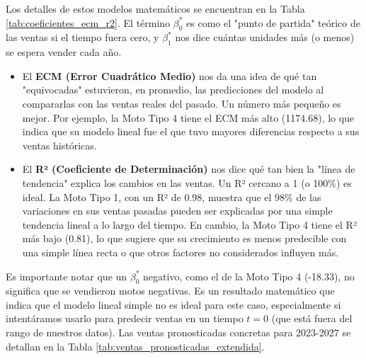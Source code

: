 \documentclass[12pt,a4paper]{article}
\begin{document}
Los detalles de estos modelos matemáticos se encuentran en la Tabla \ref{tab:coeficientes_ecm_r2}. El término $\beta_0^*$ es como el "punto de partida" teórico de las ventas si el tiempo fuera cero, y $\beta_1^*$ nos dice cuántas unidades más (o menos) se espera vender cada año.
\begin{itemize}
    \item El \textbf{ECM (Error Cuadrático Medio)} nos da una idea de qué tan "equivocadas" estuvieron, en promedio, las predicciones del modelo al compararlas con las ventas reales del pasado. Un número más pequeño es mejor. Por ejemplo, la Moto Tipo 4 tiene el ECM más alto (1174.68), lo que indica que su modelo lineal fue el que tuvo mayores diferencias respecto a sus ventas históricas.
    \item El \textbf{R² (Coeficiente de Determinación)} nos dice qué tan bien la "línea de tendencia" explica los cambios en las ventas. Un R² cercano a 1 (o 100\%) es ideal. La Moto Tipo 1, con un R² de 0.98, muestra que el 98\% de las variaciones en sus ventas pasadas pueden ser explicadas por una simple tendencia lineal a lo largo del tiempo. En cambio, la Moto Tipo 4 tiene el R² más bajo (0.81), lo que sugiere que su crecimiento es menos predecible con una simple línea recta o que otros factores no considerados influyen más.
\end{itemize}
\begin{table}[H]
\centering
\caption{Modelos de regresión, Error Cuadrático Medio (ECM) y Coeficiente de Determinación (R²) por tipo de moto (Fuente de ECM y R²: análisis del script de Python).}
\label{tab:coeficientes_ecm_r2}
\end{table}
Es importante notar que un $\beta_0^*$ negativo, como el de la Moto Tipo 4 (-18.33), no significa que se vendieron motos negativas. Es un resultado matemático que indica que el modelo lineal simple no es ideal para este caso, especialmente si intentáramos usarlo para predecir ventas en un tiempo $t=0$ (que está fuera del rango de nuestros datos). Las ventas pronosticadas concretas para 2023-2027 se detallan en la Tabla \ref{tab:ventas_pronosticadas_extendida}.
\end{document}

